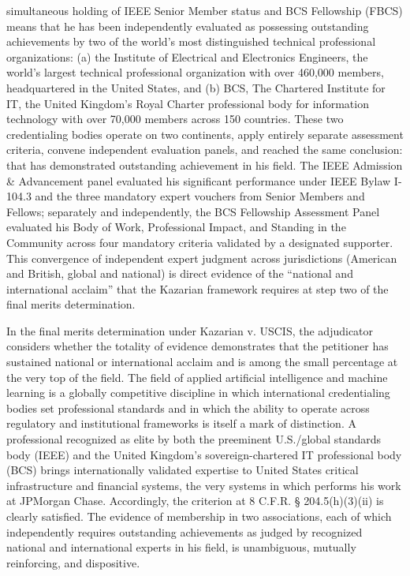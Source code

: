 \drs simultaneous holding of IEEE Senior Member status and BCS Fellowship (FBCS) means that he has been independently evaluated as possessing outstanding achievements by two of the world's most distinguished technical professional organizations: (a) the Institute of Electrical and Electronics Engineers, the world's largest technical professional organization with over 460,000 members, headquartered in the United States, and (b) BCS, The Chartered Institute for IT, the United Kingdom's Royal Charter professional body for information technology with over 70,000 members across 150 countries. These two credentialing bodies operate on two continents, apply entirely separate assessment criteria, convene independent evaluation panels, and reached the same conclusion: that \dr has demonstrated outstanding achievement in his field. The IEEE Admission \& Advancement panel evaluated his significant performance under IEEE Bylaw I-104.3 and the three mandatory expert vouchers from Senior Members and Fellows; separately and independently, the BCS Fellowship Assessment Panel evaluated his Body of Work, Professional Impact, and Standing in the Community across four mandatory criteria validated by a designated supporter. This convergence of independent expert judgment across jurisdictions (American and British, global and national) is direct evidence of the ``national and international acclaim'' that the Kazarian framework requires at step two of the final merits determination.

In the final merits determination under Kazarian v. USCIS, the adjudicator considers whether the totality of evidence demonstrates that the petitioner has sustained national or international acclaim and is among the small percentage at the very top of the field. The field of applied artificial intelligence and machine learning is a globally competitive discipline in which international credentialing bodies set professional standards and in which the ability to operate across regulatory and institutional frameworks is itself a mark of distinction. A professional recognized as elite by both the preeminent U.S./global standards body (IEEE) and the United Kingdom's sovereign-chartered IT professional body (BCS) brings internationally validated expertise to United States critical infrastructure and financial systems, the very systems in which \dr performs his work at JPMorgan Chase. Accordingly, the criterion at 8 C.F.R. § 204.5(h)(3)(ii) is clearly satisfied. The evidence of \drs membership in two associations, each of which independently requires outstanding achievements as judged by recognized national and international experts in his field, is unambiguous, mutually reinforcing, and dispositive.
